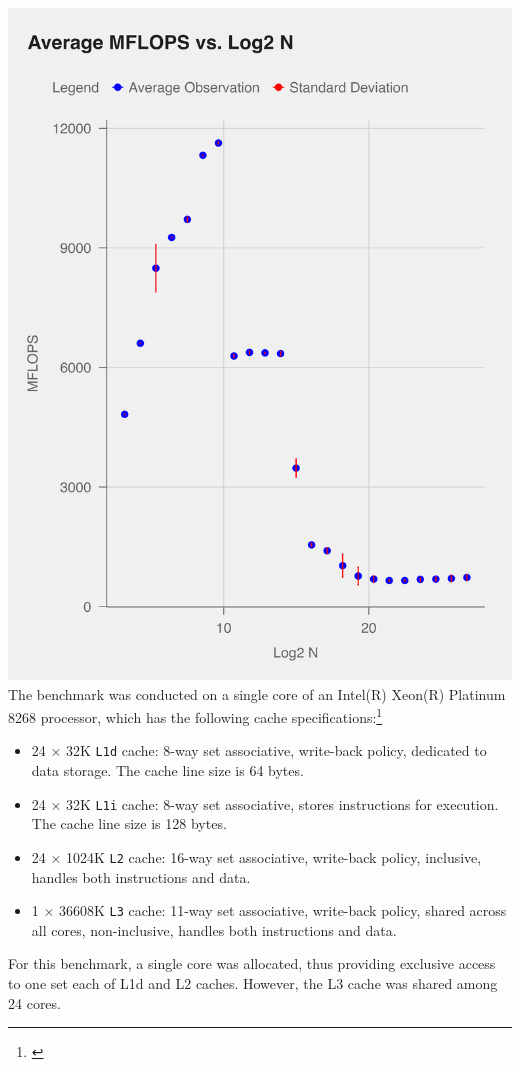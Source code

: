 \documentclass{article}
\newcommand{\MYhref}[3][blue]{\href{#2}{\color{#1}{#3}}}%
\begin{document}
\begin{multicols}{2}
    \includegraphics[width=.45\textwidth]{../part2/data/part_2_plot.png}
    \columnbreak
    \newpage
    \noindent The benchmark was conducted on a single core of an Intel(R) Xeon(R) Platinum 8268 processor, which has the following cache specifications:\footnote{\MYhref{https://www.cpu-world.com/CPUs/Xeon/Intel-Xeon\%208268.html}{Cpu World source for cache info.}}
    \begin{itemize}
        \item 24 $\times$ 32K \texttt{L1d} cache: 8-way set associative, write-back policy, dedicated to data storage. The cache line size is 64 bytes.
        \item 24 $\times$ 32K \texttt{L1i} cache: 8-way set associative, stores instructions for execution. The cache line size is 128 bytes.
        \item 24 $\times$ 1024K \texttt{L2} cache: 16-way set associative, write-back policy, inclusive, handles both instructions and data.
        \item 1 $\times$ 36608K \texttt{L3} cache: 11-way set associative, write-back policy, shared across all cores, non-inclusive, handles both instructions and data.
    \end{itemize}
\end{multicols}
\newpage
\noindent For this benchmark, a single core was allocated, thus providing exclusive access to one set each of L1d and L2 caches. However, the L3 cache was shared among 24 cores. 
\end{document}
